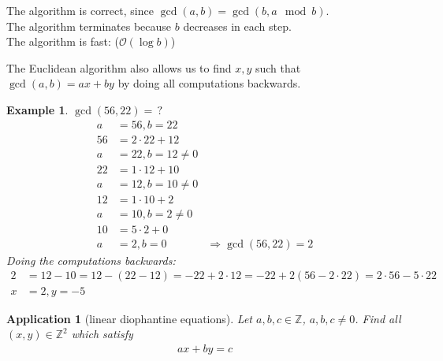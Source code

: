 \documentclass[a4paper]{article}
\newtheorem{ex}{Example}
\newtheorem*{app*}{Application}
\newcommand{\Z}{\mathbb{Z}}
\begin{document}
The algorithm is correct, since $\gcd(a,b) = \gcd(b,a \mod b)$. \\
The algorithm terminates because $b$ decreases in each step. \\
The algorithm is fast: ($\mathcal{O}(\log b)$)

The Euclidean algorithm also allows us to find $x, y$ such that $\gcd(a,b) = ax+by$ by doing all computations backwards.

\begin{ex}
  $\gcd(56,22) = \,?$
  \begin{align*}
    a &= 56, b = 22\\
    56 &= 2 \cdot 22 + 12\\
    a &= 22, b = 12 \neq 0\\
    22 &= 1 \cdot 12 + 10\\
    a &= 12, b = 10 \neq 0\\
    12 &= 1 \cdot 10 + 2\\
    a &= 10, b = 2 \neq 0\\
    10 &= 5 \cdot 2 + 0\\
    a &= 2, b = 0 & \Rightarrow \gcd(56,22) = 2
  \end{align*}
  Doing the computations backwards:
  \begin{align*}
    2 &= 12 -10 = 12 - (22 - 12) = -22 + 2 \cdot 12 = -22 + 2(56-2 \cdot 22) = 2 \cdot 56 - 5 \cdot 22\\
    x &= 2, y = -5
  \end{align*}
\end{ex}

\begin{app*}[linear diophantine equations]
Let $a,b,c \in \Z$, $a,b,c \neq 0$. Find all $(x,y) \in \Z^2$ which satisfy
\begin{align}
  \label{eq:lde}
  ax+by = c
\end{align}
\end{app*}
\end{document}
